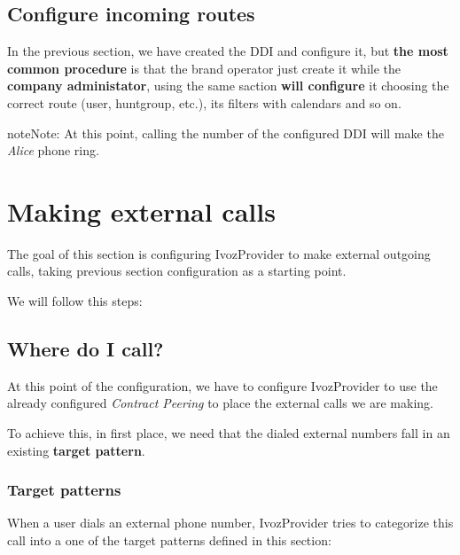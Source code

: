 \documentclass[letterpaper,10pt,english]{sphinxmanual}
\begin{document}
\section{Configure incoming routes}
\label{external_incoming_calls/configure_ddi:configure-incoming-routes}
In the previous section, we have created the DDI and configure it, but \textbf{the
most common procedure} is that the brand operator just create it while the
\textbf{company administator}, using the same saction \textbf{will configure} it choosing
the correct route (user, huntgroup, etc.), its filters with calendars and so on.

\begin{notice}{note}{Note:}
At this point, calling the number of the configured DDI will make the
\emph{Alice} phone ring.
\end{notice}


\chapter{Making external calls}
\label{external_outgoing_calls/index:making-external-calls}\label{external_outgoing_calls/index::doc}
The goal of this section is configuring IvozProvider to make external outgoing
calls, taking previous section configuration as a starting point.

We will follow this steps:


\section{Where do I call?}
\label{external_outgoing_calls/call_types::doc}\label{external_outgoing_calls/call_types:where-do-i-call}
At this point of the configuration, we have to configure IvozProvider to use the
already configured \emph{Contract Peering} to place the external calls we are making.

To achieve this, in first place, we need that the dialed external numbers fall
in an existing \textbf{target pattern}.


\subsection{Target patterns}
\label{external_outgoing_calls/call_types:target-patterns}\label{external_outgoing_calls/call_types:id1}
When a user dials an external phone number, IvozProvider tries to categorize
this call into a one of the target patterns defined in this section:

\end{document}

